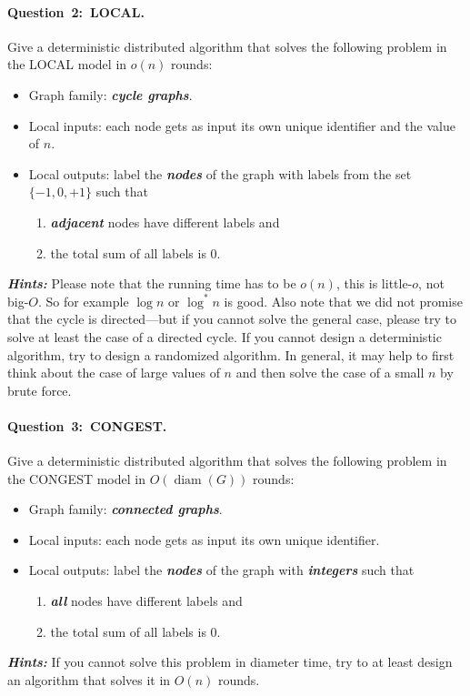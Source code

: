 \documentclass[12pt,a4paper]{article}
\newcommand{\q}[2]{\paragraph{\mbox{Question #1: }#2.}}
\newcommand{\hl}[1]{\textbf{\emph{#1}}}
\newcommand{\cemph}[1]{\textcolor{hlcolor}{\textbf{\emph{\boldmath #1}}}}
\DeclareMathOperator{\diam}{diam}
\begin{document}
\q{2}{LOCAL}

Give a deterministic distributed algorithm that solves the following problem in the LOCAL model in \cemph{$o(n)$} rounds:
\begin{itemize}
    \item Graph family: \cemph{cycle graphs}.
    \item Local inputs: each node gets as input its own unique identifier and the value of $n$.
    \item Local outputs: label the \cemph{nodes} of the graph with labels from the set \cemph{$\{-1, 0, +1\}$} such that
    \begin{enumerate}[noitemsep]
        \item \cemph{adjacent} nodes have different labels and
        \item the total sum of all labels is $0$.
    \end{enumerate}
\end{itemize}
\hl{Hints:} Please note that the running time has to be $o(n)$, this is little-$o$, not big-$O$. So for example $\log n$ or $\log^* n$ is good. Also note that we did not promise that the cycle is directed---but if you cannot solve the general case, please try to solve at least the case of a directed cycle. If you cannot design a deterministic algorithm, try to design a randomized algorithm. In general, it may help to first think about the case of large values of $n$ and then solve the case of a small $n$ by brute force.

\q{3}{CONGEST}

Give a deterministic distributed algorithm that solves the following problem in the CONGEST model in \cemph{$O(\diam(G))$} rounds:
\begin{itemize}
    \item Graph family: \cemph{connected graphs}.
    \item Local inputs: each node gets as input its own unique identifier.
    \item Local outputs: label the \cemph{nodes} of the graph with \cemph{integers} such that
    \begin{enumerate}[noitemsep]
        \item \cemph{all} nodes have different labels and
        \item the total sum of all labels is $0$.
    \end{enumerate}
\end{itemize}
\hl{Hints:} If you cannot solve this problem in diameter time, try to at least design an algorithm that solves it in $O(n)$ rounds.
\end{document}
